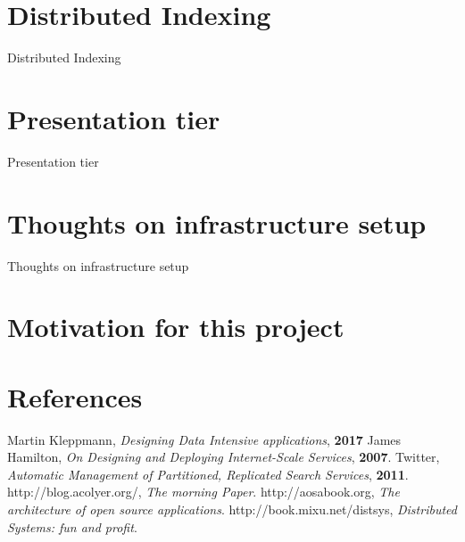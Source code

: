\documentclass[9pt]{beamer}
\begin{document}

\section{Distributed Indexing}
\begin{frame}{Distributed Indexing}
  
\end{frame}


\section{Presentation tier}
\begin{frame}{Presentation tier}
  
\end{frame}


\section{Thoughts on infrastructure setup}
\begin{frame}{Thoughts on infrastructure setup}
  
\end{frame}


\section{Motivation for this project}
\begin{frame}{}
  
\end{frame}


\section{References}
\begin{frame}
  
  \begin{thebibliography}{99}
   Martin Kleppmann, \newblock \emph{Designing Data Intensive applications}, \textbf{2017}
   James Hamilton,  \newblock \emph{On Designing and Deploying Internet-Scale Services}, \textbf{2007}.
   Twitter,  \newblock \emph{Automatic Management of Partitioned, Replicated Search Services}, \textbf{2011}.
   http://blog.acolyer.org/, \newblock \emph{The morning Paper}.
   http://aosabook.org, \newblock \emph{The architecture of open source applications}.
   http://book.mixu.net/distsys, \newblock \emph{Distributed Systems: fun and profit}.
  \end{thebibliography}
\end{frame}

\begin{frame}{}
\end{frame}
\end{document}
